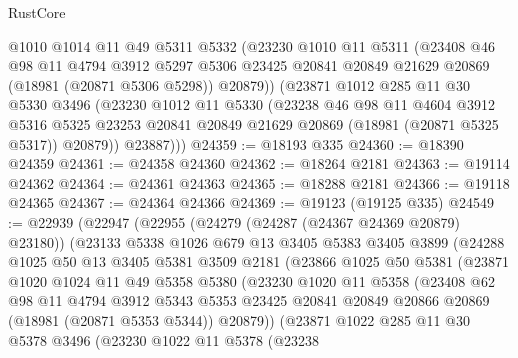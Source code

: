 \begin{lexlean}{RustCore}
\begin{coremodule}
        @1010
        @1014
        @11
        @49
        @5311
        @5332
        (@23230
          @1010
          @11
          @5311
          (@23408
            @46
            @98
            @11
            @4794
            @3912
            @5297
            @5306
            @23425
            @20841
            @20849
            @21629
            @20869
            (@18981 (@20871 @5306 @5298))
            @20879))
        (@23871
          @1012
          @285
          @11
          @30
          @5330
          @3496
          (@23230
            @1012
            @11
            @5330
            (@23238
              @46
              @98
              @11
              @4604
              @3912
              @5316
              @5325
              @23253
              @20841
              @20849
              @21629
              @20869
              (@18981 (@20871 @5325 @5317))
              @20879))
          @23887)))
@24359 := @18193 @335
@24360 := @18390 @24359
@24361 := @24358 @24360
@24362 := @18264 @2181
@24363 := @19114 @24362
@24364 := @24361 @24363
@24365 := @18288 @2181
@24366 := @19118 @24365
@24367 := @24364 @24366
@24369 := @19123 (@19125 @335)
@24549 := @22939
    (@22947
      (@22955
        (@24279 (@24287 (@24367 @24369 @20879) @23180))
        (@23133
          @5338
          @1026
          @679
          @13
          @3405
          @5383
          @3405
          @3899
          (@24288
            @1025
            @50
            @13
            @3405
            @5381
            @3509
            @2181
            (@23866
              @1025
              @50
              @5381
              (@23871
                @1020
                @1024
                @11
                @49
                @5358
                @5380
                (@23230
                  @1020
                  @11
                  @5358
                  (@23408
                    @62
                    @98
                    @11
                    @4794
                    @3912
                    @5343
                    @5353
                    @23425
                    @20841
                    @20849
                    @20866
                    @20869
                    (@18981 (@20871 @5353 @5344))
                    @20879))
                (@23871
                  @1022
                  @285
                  @11
                  @30
                  @5378
                  @3496
                  (@23230
                    @1022
                    @11
                    @5378
                    (@23238

\end{coremodule}
\end{lexlean}
